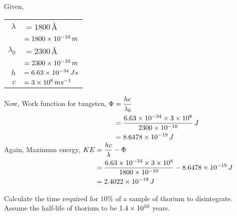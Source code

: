 \documentclass[../main.tex]{subfiles}
\begin{document}
\begin{soln}
    Given,
    \begin{table}[H]
        \begin{tabular}{rl}
            \hspace{2.5cm}$ \lambda $ & $ =1800\,$\AA       \\
                                      & $ =1800\times 10^{-10}\,m$  \\
            $ \lambda_0 $               & $ =2300\,$\AA       \\
                                      & $ =2300\times 10^{-10}\,m$  \\
            $ h $                     & $ =6.63\times 10^{-34}\,Js $ \\
            $ c$                      & $ =3\times 10^{8}\,ms^{-1} $ 
        \end{tabular}
    \end{table}
    Now,
    \indent Work function for tungsten, $ \Phi\begin{aligned}[t]
        &=\frac{hc}{\lambda_0}\\
        &=\frac{6.63\times 10^{-34}\times 3\times 10^{8}}{2300\times 10^{-10}}\,J\\
        &=8.6478\times 10^{-19}\,J
    \end{aligned} $\\
    Again,
    \indent Maximum energy, $ KE\begin{aligned}[t]
        &=\frac{hc}{\lambda}-\Phi\\
        &=\frac{6.63\times 10^{-34}\times 3\times 10^{8}}{1800\times 10^{-10}}-8.6478\times 10^{-19}\,J\\
        &=2.4022\times 10^{-19}\,J
    \end{aligned} $\\
\end{soln}
\newpage
\begin{prob}
    Calculate the time required for $ 10\% $ of a sample of thorium to disintegrate. Assume the half-life of thorium to be $ 1.4\times 10^{10} $ years.
\end{prob}
\end{document}
